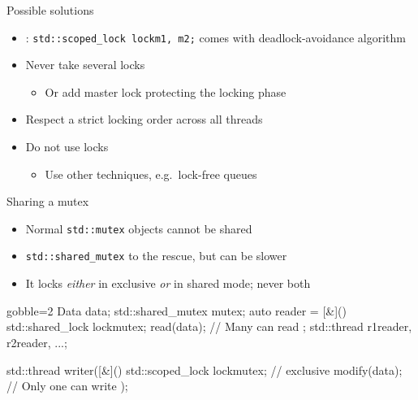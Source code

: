 \begin{frame}[fragile]
  \begin{block}{Possible solutions}
    \begin{itemize}
    \item {}: \texttt{std::scoped_lock lock{m1, m2};} comes with deadlock-avoidance algorithm
    \item Never take several locks
      \begin{itemize}
      \item Or add master lock protecting the locking phase
      \end{itemize}
    \item Respect a strict locking order across all threads
    \item Do not use locks
      \begin{itemize}
      \item Use other techniques, e.g.\ lock-free queues
      \end{itemize}
    \end{itemize}
  \end{block}
\end{frame}

\begin{frame}[fragile]
  \begin{block}{Sharing a mutex}
    \begin{itemize}
      \item Normal \texttt{std::mutex} objects cannot be shared
      \item \texttt{std::shared_mutex} to the rescue, but can be slower
      \item It locks \emph{either} in exclusive \emph{or} in shared mode; never both
    \end{itemize}
  \end{block}
  \begin{exampleblock}{}
    \begin{cppcode*}{gobble=2}
      Data data; std::shared_mutex mutex;
      auto reader = [&](){
        std::shared_lock lock{mutex};
        read(data); // Many can read
      };
      std::thread r1{reader}, r2{reader}, ...;

      std::thread writer([&](){
        std::scoped_lock lock{mutex}; // exclusive
        modify(data); // Only one can write
      });
    \end{cppcode*}
  \end{exampleblock}
\end{frame}
